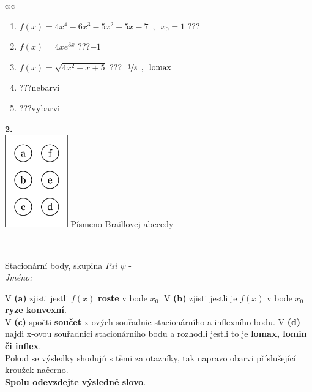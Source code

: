 \documentclass[10pt]{report}
\begin{document}
\begin{tabular}{c:c}
\begin{minipage}[c][104.5mm][t]{0.5\linewidth}
\begin{center}
\begin{minipage}{0.79\linewidth}
\begin{center}
\begin{varwidth}{\linewidth}
\begin{enumerate}
\item $f(x)=4x^4-6x^3-5x^2-5x-7\enspace , \enspace x_0=1$\quad \dotfill\; ???\;\dotfill \quad {}
\item $f(x)=4xe^{3x}$\quad \dotfill\; ???\;\dotfill \quad $-1$
\item $f(x)=\sqrt{4x^2+x+5}$\quad \dotfill\; ???\;\dotfill \quad $\nicefrac{-1}{8}\enspace , \enspace\mathrm{lomax}$
\item \quad \dotfill\; ???\;\dotfill \quad nebarvi
\item \quad \dotfill\; ???\;\dotfill \quad vybarvi
\end{enumerate}
\end{varwidth}
\end{center}
\end{minipage}
\begin{minipage}{0.20\linewidth}
\begin{center}
{\Huge\bfseries 2.} \\[2mm]
\includegraphics[height=40mm]{../images/braille.png}
{\small Písmeno Braillovej abecedy}
\end{center}
\end{minipage}
\end{center}
\end{minipage}
\\ \hdashline
\begin{minipage}[c][104.5mm][t]{0.5\linewidth}
\begin{center}
\vspace{7mm}
{\huge Stacionární body, skupina \textit{Psi $\psi$} -}\\[5mm]
\textit{Jméno:}\phantom{xxxxxxxxxxxxxxxxxxxxxxxxxxxxxxxxxxxxxxxxxxxxxxxxxxxxxxxxxxxxxxxxx}\\[5mm]
\begin{minipage}{0.95\linewidth}
\begin{center}
{\small V \textbf{(a)} zjisti jestli $f(x)$ \textbf{roste} v bode $x_0$. V \textbf{(b)} zjisti jestli je $f(x)$ v bode $x_0$ \textbf{ryze konvexní}.\\V \textbf{(c)} spočti \textbf{součet} x-ových souřadnic stacionárního a inflexního bodu. V \textbf{(d)} najdi x-ovou souřadnici stacionárního bodu a rozhodli jestli to je \textbf{lomax, lomin či inflex}.\\Pokud se výsledky shodujú s těmi za otazníky, tak napravo obarvi příslušející kroužek načerno.\\\textbf{Spolu odevzdejte výsledné slovo}}.

\end{center}
\end{minipage}
\end{center}
\end{minipage}
\end{tabular}
\end{document}
